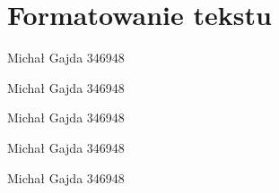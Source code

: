 \documentclass[12pt,a4paper]{article}
\begin{document}
\section{Formatowanie tekstu}
\begin{center}
\lipsum[1]
\end{center}

\begin{center}
\lipsum[2]
\end{center}

\begin{center}
\lipsum[3]
\end{center}

\begin{center}
\lipsum[4]
\end{center}

\begin{flushright}
\lipsum[5]
\end{flushright}

\begin{flushright}
\lipsum[6]
\end{flushright}

\begin{flushright}
\lipsum[7]
\end{flushright}

\begin{flushleft}
\lipsum[8]
\end{flushleft}

\begin{flushleft}
\lipsum[9]
\end{flushleft}

\begin{flushleft}
\lipsum[10]
\end{flushleft}

{\tiny Michał Gajda 346948}

{\small Michał Gajda 346948}

{\normalsize Michał Gajda 346948}

{\large Michał Gajda 346948}

{\huge Michał Gajda 346948}
\end{document}
